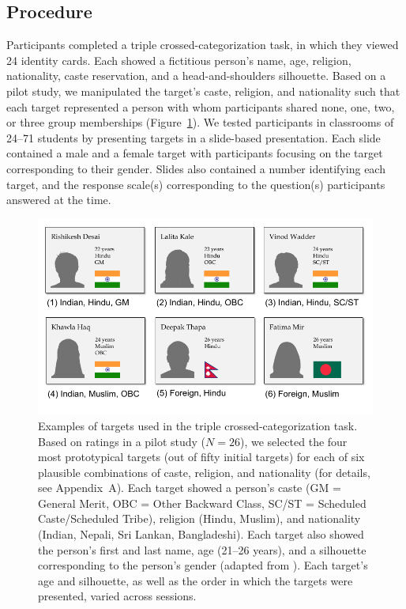 \documentclass[12pt, a4paper]{article}
\begin{document}
\subsection{Procedure}

Participants completed a triple crossed-categorization task, in which they viewed 24 identity cards. Each showed a fictitious person's name, age, religion, nationality, caste reservation, and a head-and-shoulders silhouette. Based on a pilot study, we manipulated the target's caste, religion, and nationality such that each target represented a person with whom participants shared none, one, two, or three group memberships (Figure~\ref{fig:f2}). We tested participants in classrooms of 24--71 students by presenting targets in a slide-based presentation. Each slide contained a male and a female target with participants focusing on the target corresponding to their gender. Slides also contained a number identifying each target, and the response scale(s) corresponding to the question(s) participants answered at the time. 

\begin{figure}
\centering
\includegraphics[scale=1]{../figures/figure-2}
\caption{Examples of targets used in the triple crossed-categorization task. Based on ratings in a pilot study ($N = 26$), we selected the four most prototypical targets (out of fifty initial targets) for each of six plausible combinations of caste, religion, and nationality (for details, see Appendix~A). Each target showed a person's caste (GM = General Merit, OBC = Other Backward Class, SC/ST = Scheduled Caste/Scheduled Tribe), religion (Hindu, Muslim), and nationality (Indian, Nepali, Sri Lankan, Bangladeshi). Each target also showed the person's first and last name, age (21--26 years), and a silhouette corresponding to the person's gender (adapted from \protect{}). Each target's age and silhouette, as well as the order in which the targets were presented, varied across sessions.}
\label{fig:f2}
\end{figure}
\end{document}
